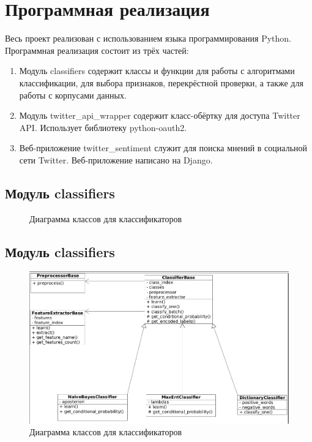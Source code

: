 \section{Программная реализация}

Весь проект реализован с использованием языка программирования Python. Программная реализация состоит из трёх частей:
\begin{enumerate}
\item 
Модуль classifiers содержит классы и функции для работы с
алгоритмами классификации, для выбора признаков,
перекрёстной проверки, а также для работы с корпусами данных.

\item 
Модуль twitter\_api\_wrapper содержит класс-обёртку для 
доступа Twitter API. Использует библиотеку python-oauth2.

\item 
Веб-приложение twitter\_sentiment служит для поиска
мнений в социальной сети Twitter. Веб-приложение написано на Django.
\end{enumerate}

\subsection{Модуль classifiers}
\begin{figure}[!ht]
\begin{center}

\caption{Диаграмма классов для классификаторов}
\label{gr:test}
\end{center}
\end{figure} 

\subsection{Модуль classifiers}
\begin{figure}[!ht]
\begin{center}
\includegraphics[scale=0.4, trim=0mm 0mm 0mm 0mm, clip]{../resources/uml/diag1.png}
\caption{Диаграмма классов для классификаторов}
\label{gr:classifiers}
\end{center}
\end{figure} 

